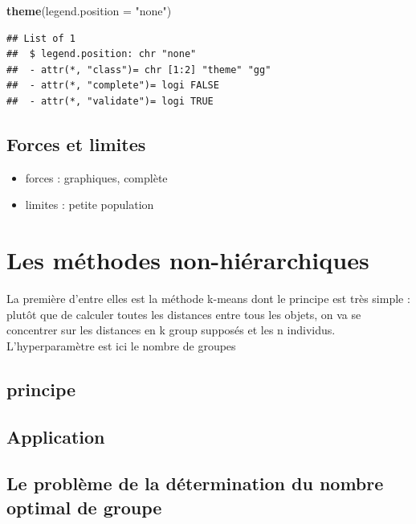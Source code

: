 \documentclass[
]{book}
\newenvironment{Shaded}{\begin{snugshade}}{\end{snugshade}}
\newcommand{\DataTypeTok}[1]{\textcolor[rgb]{0.13,0.29,0.53}{#1}}
\newcommand{\KeywordTok}[1]{\textcolor[rgb]{0.13,0.29,0.53}{\textbf{#1}}}
\newcommand{\NormalTok}[1]{#1}
\newcommand{\StringTok}[1]{\textcolor[rgb]{0.31,0.60,0.02}{#1}}
\providecommand{\tightlist}{%
  \setlength{\itemsep}{0pt}\setlength{\parskip}{0pt}}
\begin{document}
\begin{Shaded}
\begin{Highlighting}[]
  \KeywordTok{theme}\NormalTok{(}\DataTypeTok{legend.position =} \StringTok{"none"}\NormalTok{)}
\end{Highlighting}
\end{Shaded}

\begin{verbatim}
## List of 1
##  $ legend.position: chr "none"
##  - attr(*, "class")= chr [1:2] "theme" "gg"
##  - attr(*, "complete")= logi FALSE
##  - attr(*, "validate")= logi TRUE
\end{verbatim}

\hypertarget{forces-et-limites}{%
\subsection{Forces et limites}\label{forces-et-limites}}

\begin{itemize}
\tightlist
\item
  forces : graphiques, complète
\item
  limites : petite population
\end{itemize}

\hypertarget{les-muxe9thodes-non-hiuxe9rarchiques}{%
\section{Les méthodes non-hiérarchiques}\label{les-muxe9thodes-non-hiuxe9rarchiques}}

La première d'entre elles est la méthode k-means dont le principe est très simple : plutôt que de calculer toutes les distances entre tous les objets, on va se concentrer sur les distances en k group supposés et les n individus. L'hyperparamètre est ici le nombre de groupes

\hypertarget{principe}{%
\subsection{principe}\label{principe}}

\hypertarget{application-1}{%
\subsection{Application}\label{application-1}}

\hypertarget{le-probluxe8me-de-la-duxe9termination-du-nombre-optimal-de-groupe}{%
\subsection{Le problème de la détermination du nombre optimal de groupe}\label{le-probluxe8me-de-la-duxe9termination-du-nombre-optimal-de-groupe}}
\end{document}
